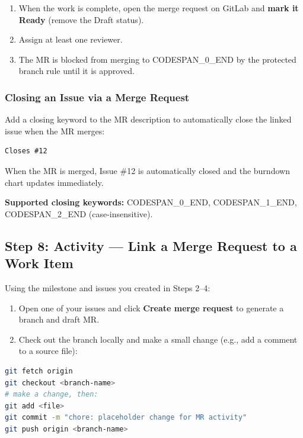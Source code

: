 \documentclass[11pt,a4paper]{book}
\begin{document}
\begin{enumerate}
  \item When the work is complete, open the merge request on GitLab and \textbf{mark it Ready} (remove the Draft status).
  \item Assign at least one reviewer.
  \item The MR is blocked from merging to CODESPAN\_0\_END by the protected branch rule until it is approved.
\end{enumerate}

\subsubsection{Closing an Issue via a Merge Request}

Add a closing keyword to the MR description to automatically close the linked issue when the MR merges:

\begin{lstlisting}
Closes #12
\end{lstlisting}

When the MR is merged, Issue \#12 is automatically closed and the burndown chart updates immediately.

\textbf{Supported closing keywords:} CODESPAN\_0\_END, CODESPAN\_1\_END, CODESPAN\_2\_END (case-insensitive).

\medskip

\subsection{Step 8: Activity --- Link a Merge Request to a Work Item}

Using the milestone and issues you created in Steps 2--4:

\begin{enumerate}
  \item Open one of your issues and click \textbf{Create merge request} to generate a branch and draft MR.
  \item Check out the branch locally and make a small change (e.g., add a comment to a source file):
\end{enumerate}

\begin{lstlisting}[language=Bash]
git fetch origin
git checkout <branch-name>
# make a change, then:
git add <file>
git commit -m "chore: placeholder change for MR activity"
git push origin <branch-name>
\end{lstlisting}
\end{document}
